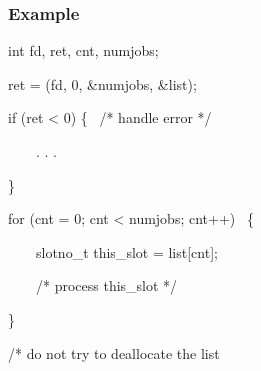 \subsubsection{Example}

\begin{expara}

int fd, ret, cnt, numjobs;

\bigskip


ret = \funcnameXBjoblist{}(fd, 0, \&numjobs, \&list);

if (ret {\textless} 0) \{ \ /* handle error */

\ \ \ \ . . .

\}

\bigskip


for (cnt = 0; cnt {\textless} numjobs; cnt++) \ \{

\ \ \ \ slotno\_t this\_slot = list[cnt];

\ \ \ \ /* process this\_slot */

\}

\bigskip


/* do not try to deallocate the list

\end{expara}

